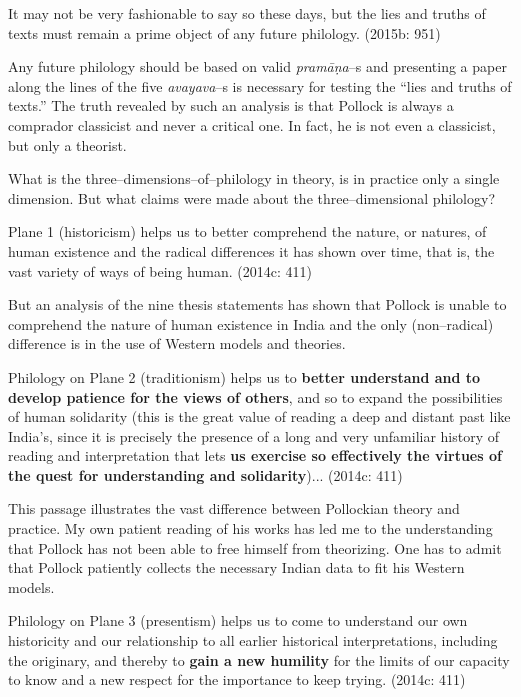\begin{myquote}
It may not be very fashionable to say so these days, but the lies and truths of texts must remain a prime object of any future philology. (2015b: 951)
\end{myquote}

Any future philology should be based on valid\textit{ pramāṇa}–s and presenting a paper along the lines of the five \textit{avayava}–s is necessary for testing the “lies and truths of texts.” The truth revealed by such an analysis is that Pollock is always a comprador classicist and never a critical one. In fact, he is not even a classicist, but only a theorist.

What is the three–dimensions–of–philology in theory, is in practice only a single dimension. But what claims were made about the three–dimensional philology?

\begin{myquote}
Plane 1 (historicism) helps us to better comprehend the nature, or natures, of human existence and the radical differences it has shown over time, that is, the vast variety of ways of being human. (2014c: 411)
\end{myquote}

But an analysis of the nine thesis statements has shown that Pollock is unable to comprehend the nature of human existence in India and the only (non–radical) difference is in the use of Western models and theories.

\begin{myquote}
Philology on Plane 2 (traditionism) helps us to \textbf{better understand and to develop patience for the views of others}, and so to expand the possibilities of human solidarity (this is the great value of reading a deep and distant past like India’s, since it is precisely the presence of a long and very unfamiliar history of reading and interpretation that lets \textbf{us exercise so effectively the virtues of the quest for understanding and solidarity})... (2014c: 411)
\end{myquote}

This passage illustrates the vast difference between Pollockian theory and practice. My own patient reading of his works has led me to the understanding that Pollock has not been able to free himself from theorizing. One has to admit that Pollock patiently collects the necessary Indian data to fit his Western models.

\begin{myquote}
Philology on Plane 3 (presentism) helps us to come to understand our own historicity and our relationship to all earlier historical interpretations, including the originary, and thereby to \textbf{gain a new humility} for the limits of our capacity to know and a new respect for the importance to keep trying. (2014c: 411)
\end{myquote}

